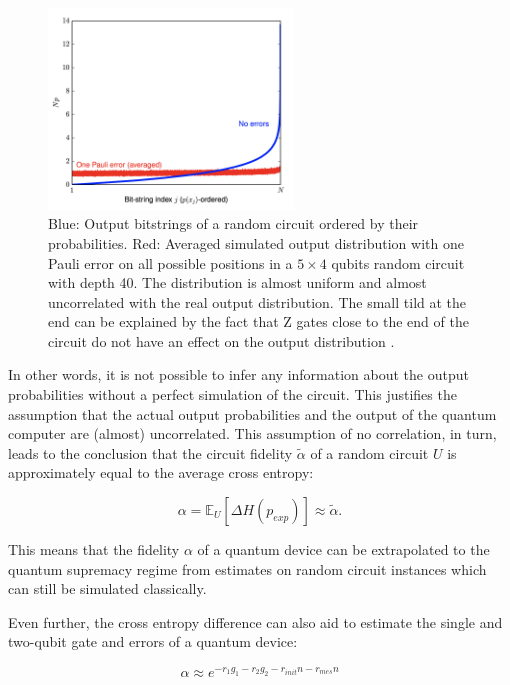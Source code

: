 \begin{figure}[H]
  \centering
  \label{fig:rcs_noise}
  \includegraphics[width=0.58\textwidth]{figures/rcs_noise}
  \caption[Effect of one Pauli Error on Random Circuits]{Blue: Output bitstrings of a random circuit ordered by their probabilities. Red: Averaged 
  simulated output distribution with one Pauli error on all possible positions in a $5 \times 4$ qubits random circuit 
  with depth 40. The distribution is almost uniform and almost uncorrelated with the real output distribution. The small tild at 
  the end can be explained by the fact that Z gates close to the end of the circuit do not have an effect on the output distribution \cite{Boixo2018supremacy}.}
\end{figure}

In other words, it is not possible to infer any information about the output
probabilities without a perfect simulation of the circuit.
This justifies the assumption that the actual output probabilities and the output
of the quantum computer are (almost) uncorrelated.
This assumption of no correlation, in turn, leads to the conclusion that the
circuit fidelity $\tilde{\alpha}$ of a random
circuit $U$ is approximately equal to the average cross entropy:

\begin{equation}
  \label{eq:extrapolate}
  \alpha = \mathbb{E}_U[\Delta H(p_{exp})] \approx \tilde{\alpha}.
\end{equation}

This means that the fidelity $\alpha$ of a quantum device can be extrapolated to
the quantum supremacy regime from estimates on random circuit instances
which can still be simulated classically.

Even further, the cross entropy difference can also aid to estimate
the single and two-qubit gate and errors of a quantum device:

\begin{equation}
  \alpha \approx e^{-r_1g_1 - r_2g_2 -r_{init}n -r_{mes}n}
\end{equation}

